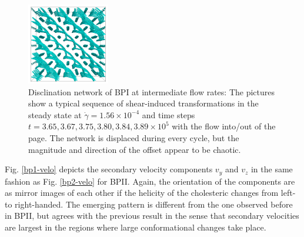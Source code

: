 \documentclass[aps,pre,reprint,superscriptaddress, twocolumn]{revtex4}
\newcommand{\e}[1]{\times10^{#1}}
\newcommand{\gd}{\dot{\gamma}}
\begin{document}
\begin{figure}[htpb]
\includegraphics[width=0.32\textwidth]{disc-389k_run914.png}
\caption{Disclination network of BPI at intermediate flow rates: The pictures show a typical sequence of shear-induced transformations in the steady state at $\gd=1.56\e{-4}$ and time steps $t=3.65, 3.67,3.75,3.80,3.84,3.89\e{5}$ with the flow into/out of the page. The network is displaced during every cycle, but the magnitude and direction of the offset appear to be chaotic.}
\label{bp1-med}
\end{figure}

Fig. \ref{bp1-velo} depicts the secondary velocity components $v_y$ and $v_z$ in the same fashion as Fig. \ref{bp2-velo} for BPII. Again, the orientation of the components are as mirror images of each other if the helicity of the cholesteric changes from left- to right-handed.
The emerging pattern is different from the one observed before in BPII, but agrees with
the previous result in the sense that secondary velocities are largest in the regions
where large conformational changes take place. 
\end{document}
